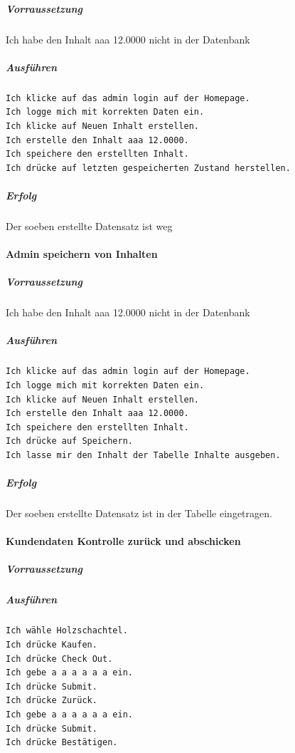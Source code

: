\documentclass[a4paper, 11pt]{article}
\begin{document}
\subparagraph{Vorraussetzung}

Ich habe den Inhalt aaa 12.0000 nicht in der Datenbank

\subparagraph{Ausführen}

\begin{verbatim}
Ich klicke auf das admin login auf der Homepage.
Ich logge mich mit korrekten Daten ein.
Ich klicke auf Neuen Inhalt erstellen.
Ich erstelle den Inhalt aaa 12.0000.
Ich speichere den erstellten Inhalt.
Ich drücke auf letzten gespeicherten Zustand herstellen.
\end{verbatim}

\subparagraph{Erfolg}

Der soeben erstellte Datensatz ist weg

\paragraph{Admin speichern von Inhalten}

\subparagraph{Vorraussetzung}

Ich habe den Inhalt aaa 12.0000 nicht in der Datenbank

\subparagraph{Ausführen}

\begin{verbatim}
Ich klicke auf das admin login auf der Homepage.
Ich logge mich mit korrekten Daten ein.
Ich klicke auf Neuen Inhalt erstellen.
Ich erstelle den Inhalt aaa 12.0000.
Ich speichere den erstellten Inhalt.
Ich drücke auf Speichern.
Ich lasse mir den Inhalt der Tabelle Inhalte ausgeben.
\end{verbatim}

\subparagraph{Erfolg}

Der soeben erstellte Datensatz ist in der Tabelle eingetragen.

\paragraph{Kundendaten Kontrolle zurück und abschicken}

\subparagraph{Vorraussetzung}

\subparagraph{Ausführen}

\begin{verbatim}
Ich wähle Holzschachtel.
Ich drücke Kaufen.
Ich drücke Check Out.
Ich gebe a a a a a a ein.
Ich drücke Submit.
Ich drücke Zurück.
Ich gebe a a a a a a ein.
Ich drücke Submit.
Ich drücke Bestätigen.
\end{verbatim}
\end{document}
